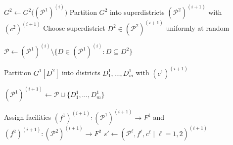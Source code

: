 \documentclass[preprint,12pt,authoryear]{elsarticle}
\theoremstyle{definition}
\begin{document}
\begin{algorithm}[H]
\LinesNumbered
\caption{Outline of FalCom for $|L| = 2$}\label{alg:overview}


\BlankLine

$G^2 \leftarrow G^2\bigl((\mathcal{P}^1)^{(i)}\bigr)$ 
Partition $G^2$ into superdistricts $(\mathcal{P}^2)^{(i+1)}$ with $(c^2)^{(i+1)}$ 
Choose superdistrict $D^2 \in (\mathcal{P}^2)^{(i+1)}$
    uniformly at random\;

$\mathcal{P} \leftarrow (\mathcal{P}^1)^{(i)}
    \setminus \{D \in (\mathcal{P}^1)^{(i)} : D \subseteq D^2\}$

Partition $G^1[D^2]$ into districts
    $D_1^1, \ldots, D_m^1$ with $(c^1)^{(i+1)}$

$(\mathcal{P}^1)^{(i+1)} \leftarrow
    \mathcal{P} \cup \{D_1^1, \ldots, D_m^1\}$\;

Assign facilities $(f^1)^{(i+1)} \colon (\mathcal{P}^1)^{(i+1)} \to F^1$ and $(f^2)^{(i+1)} \colon (\mathcal{P}^2)^{(i+1)} \to F^2$ 
$s' \leftarrow
    (\mathcal{P}^\ell, f^\ell, c^\ell \mid \ell=1,2)^{(i+1)}$\;

\BlankLine
{}
\end{algorithm}

\medskip
\end{document}

